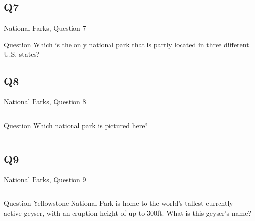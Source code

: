 \documentclass[11pt]{beamer}
\begin{document}
\subsection*{Q7}
\begin{frame}[t]{National Parks, Question 7}
\begin{block}{Question}
Which is the only national park that is partly located in three different U.S. states?
\end{block}
\end{frame}
\subsection*{Q8}
\begin{frame}[t]{National Parks, Question 8}
\begin{columns}[T,totalwidth=\linewidth]
\begin{column}{0.32\linewidth}
\begin{block}{Question}
Which national park is pictured here?
\end{block}
\end{column}
\begin{column}{0.65\linewidth}
\begin{center}
\texttt{[image: \{Images/brycecanyon]}.jpg}
\end{center}
\end{column}
\end{columns}
\end{frame}
\subsection*{Q9}
\begin{frame}[t]{National Parks, Question 9}
\begin{columns}[T,totalwidth=\linewidth]
\begin{column}{0.32\linewidth}
\begin{block}{Question}
Yellowstone National Park is home to the world's tallest currently active geyser, with an eruption height of up to 300ft. What is this geyser's name?
\end{block}
\end{column}
\begin{column}{0.65\linewidth}
\begin{center}
\texttt{[image: \{Images/steamboargeyser]}.jpg}
\end{center}
\end{column}
\end{columns}
\end{frame}
\end{document}
